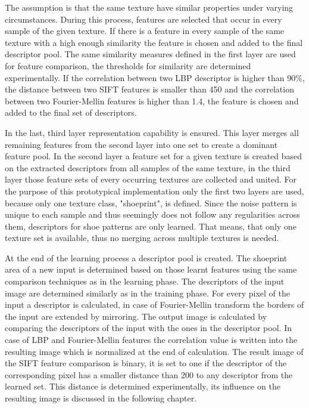 \documentclass[draft,final]{vutinfth} %
\begin{document}
The assumption is that the same texture have similar properties under varying circumstances.
During this process, features are selected that occur in every sample of the given texture.
If there is a feature in every sample of the same texture with a high enough similarity the feature is chosen and added to the final descriptor pool.
The same similarity measures defined in the first layer are used for feature comparison, the thresholds for similarity are determined experimentally.
If the correlation between two LBP descriptor is higher than 90\%, the distance between two SIFT features is smaller than 450 and the correlation between two Fourier-Mellin features is higher than 1.4, the feature is chosen and added to the final set of descriptors.
\par
In the last, third layer representation capability is ensured.
This layer merges all remaining features from the second layer into one set to create a dominant feature pool.
In the second layer a feature set for a given texture is created based on the extracted descriptors from all samples of the same texture, in the third layer those feature sets of every occurring textures are collected and united.
For the purpose of this prototypical implementation only the first two layers are used, because only one texture class, "shoeprint", is defined.
Since the noise pattern is unique to each sample and thus seemingly does not follow any regularities across them, descriptors for shoe patterns are only learned.
That means, that only one texture set is available, thus no merging across multiple textures is needed.
\par
At the end of the learning process a descriptor pool is created.
The shoeprint area of a new input is determined based on those learnt features using the same comparison techniques as in the learning phase.
The descriptors of the input image are determined similarly as in the training phase.
For every pixel of the input a descriptor is calculated, in case of Fourier-Mellin transform the borders of the input are extended by mirroring.
The output image is calculated by comparing the descriptors of the input with the ones in the descriptor pool.
In case of LBP and Fourier-Mellin features the correlation value is written into the resulting image which is normalized at the end of calculation.
The result image of the SIFT feature comparison is binary, it is set to one if the descriptor of the corresponding pixel has a smaller distance than 200 to any descriptor from the learned set.
This distance is determined experimentally, its influence on the resulting image is discussed in the following chapter.
\end{document}
